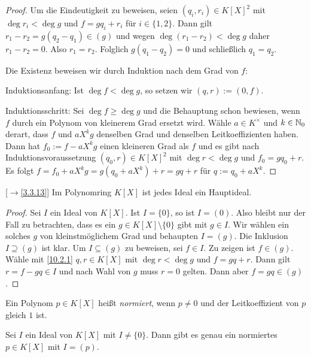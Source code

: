 \documentclass[../../main.tex]{subfiles}
\begin{document}
\begin{proof}
Um die Eindeutigkeit zu beweisen, seien $(q_i,r_i)\in K[X]^2$ mit $\deg r_i<\deg g$ und $f=gq_i+r_i$ für $i\in\{1,2\}$. Dann gilt $r_1-r_2=g(q_2-q_1)\in(g)$ und wegen
$\deg(r_1-r_2)<\deg g$ daher $r_1-r_2=0$. Also $r_1=r_2$. Folglich $g(q_1-q_2)=0$ und schließlich $q_1=q_2$.

Die Existenz beweisen wir durch Induktion nach dem Grad von $f$:

Induktionsanfang: Ist $\deg f<\deg g$, so setzen wir $(q,r):=(0,f)$.

Induktionsschritt: Sei $\deg f\ge\deg g$ und die Behauptung schon bewiesen, wenn $f$ durch ein Polynom von kleinerem Grad ersetzt wird. Wähle $a\in K^\times$ und $k\in\mathbb N_0$
derart, dass $f$ und $aX^kg$ denselben Grad und denselben Leitkoeffizienten haben. Dann hat $f_0:=f-aX^kg$ einen kleineren Grad als $f$ und es gibt nach 
Induktionsvoraussetzung $(q_0,r)\in K[X]^2$ mit $\deg r<\deg g$ und $f_0=gq_0+r$. Es folgt $f=f_0+aX^kg=g(q_0+aX^k)+r=gq+r$ für $q:=q_0+aX^k$.
\end{proof}

\begin{sat}\mbox{}{\rm[$\to$\ref{3.3.13}]}\label{10.2.2}
Im Polynomring $K[X]$ ist jedes Ideal ein Hauptideal.
\end{sat}

\begin{proof}
Sei $I$ ein Ideal von $K[X]$. Ist $I=\{0\}$, so ist $I=(0)$. Also bleibt nur der Fall zu betrachten, dass es ein $g\in K[X]\setminus\{0\}$ gibt mit $g\in I$. Wir wählen ein solches $g$
von kleinstmöglichem Grad und behaupten $I=(g)$. Die Inklusion $I\supseteq(g)$ ist klar. Um $I\subseteq(g)$ zu beweisen, sei $f\in I$. Zu zeigen ist $f\in(g)$. Wähle mit \ref{10.2.1}
$q,r\in K[X]$ mit $\deg r<\deg g$ und $f=gq+r$. Dann gilt $r=f-gq\in I$ und nach Wahl von $g$ muss $r=0$ gelten. Dann aber $f=gq\in(g)$.
\end{proof}

\begin{df}\label{10.2.3}
Ein Polynom $p\in K[X]$ heißt \emph{normiert}, wenn $p\ne0$ und der Leitkoeffizient von $p$ gleich $1$ ist.
\end{df}

\begin{kor}\label{10.2.4}
Sei $I$ ein Ideal von $K[X]$ mit $I\ne\{0\}$. Dann gibt es genau ein normiertes $p\in K[X]$ mit $I=(p)$.
\end{kor}
\end{document}
